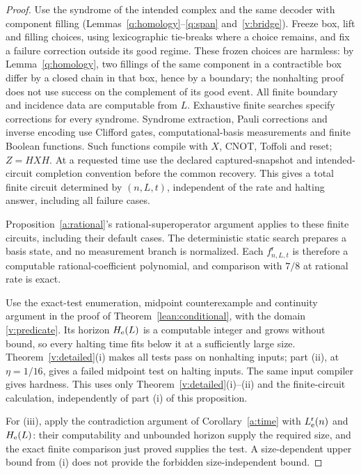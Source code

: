 \begin{proof}
Use the syndrome of the intended complex and the same decoder with component filling (Lemmas~\ref{q:homology}--\ref{q:span} and~\ref{v:bridge}).
Freeze box, lift and filling choices, using lexicographic tie-breaks
where a choice remains, and fix a failure correction outside its good
regime. These frozen choices are harmless: by Lemma~\ref{q:homology},
two fillings of the same component in a contractible box differ by a
closed chain in that box, hence by a boundary; the nonhalting proof
does not use success on the complement of its good event.
All finite boundary and incidence data are computable from \(L\).
Exhaustive finite searches specify corrections for every syndrome.
Syndrome extraction, Pauli corrections and inverse encoding use
Clifford gates, computational-basis measurements and finite Boolean
functions. Such functions compile with \(X\), CNOT, Toffoli and reset;
\(Z=HXH\). At a requested time use the declared captured-snapshot
and intended-circuit completion convention before the common
recovery. This gives a total finite circuit determined by
\((n,L,t)\), independent of the rate and halting answer, including
all failure cases.

Proposition~\ref{a:rational}'s rational-superoperator argument applies to these finite circuits, including their default cases. The deterministic static search prepares a basis state, and no measurement branch is normalized. Each \(f^{\mathsf r}_{n,L,t}\) is therefore a computable rational-coefficient polynomial, and comparison with \(7/8\) at rational rate is exact.

Use the exact-test enumeration, midpoint counterexample and continuity argument in the proof of Theorem~\ref{lean:conditional}, with the domain \eqref{v:predicate}. Its horizon \(H_{\rm e}(L)\) is a computable integer and grows without bound, so every halting time fits below it at a sufficiently large size. Theorem~\ref{v:detailed}(i) makes all tests pass on nonhalting inputs; part (ii), at \(\eta=1/16\), gives a failed midpoint test on halting inputs. The same input compiler gives hardness. This uses only Theorem~\ref{v:detailed}(i)--(ii) and the finite-circuit calculation, independently of part (i) of this proposition.

For (iii), apply the contradiction argument of Corollary~\ref{a:time} with \(L_{\rm e}^{\mathsf r}(n)\) and \(H_{\rm e}(L)\): their computability and unbounded horizon supply the required size, and the exact finite comparison just proved supplies the test. A size-dependent upper bound from (i) does not provide the forbidden size-independent bound.
\end{proof}
